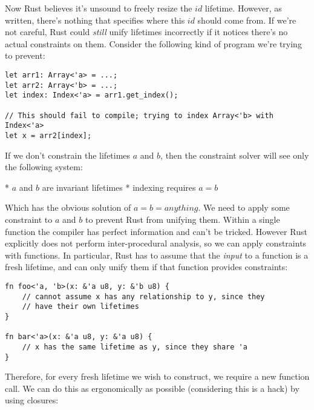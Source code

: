 Now Rust believes it's unsound to freely resize the $id$ lifetime. However, as
written, there's nothing that specifies where this $id$ should come from. If
we're not careful, Rust could \emph{still} unify lifetimes incorrectly if it notices
there's no actual constraints on them. Consider the following kind of program
we're trying to prevent:

\begin{verbatim}
let arr1: Array<'a> = ...;
let arr2: Array<'b> = ...;
let index: Index<'a> = arr1.get_index();

// This should fail to compile; trying to index Array<'b> with Index<'a>
let x = arr2[index];
\end{verbatim}

If we don't constrain the lifetimes $a$ and $b$, then the constraint solver
will see only the following system:

* $a$ and $b$ are invariant lifetimes
* indexing requires $a = b$

Which has the obvious solution of $a = b = anything$. We need to apply some
constraint to $a$ and $b$ to prevent Rust from unifying them. Within a single
function the compiler has perfect information and can't be tricked. However
Rust explicitly does not perform inter-procedural analysis, so we can apply
constraints with functions. In particular, Rust has to assume that the \emph{input}
to a function is a fresh lifetime, and can only unify them if that function
provides constraints:

\begin{verbatim}
fn foo<'a, 'b>(x: &'a u8, y: &'b u8) {
    // cannot assume x has any relationship to y, since they
    // have their own lifetimes
}

fn bar<'a>(x: &'a u8, y: &'a u8) {
    // x has the same lifetime as y, since they share 'a
}
\end{verbatim}

Therefore, for every fresh lifetime we wish to construct, we require a new
function call. We can do this as ergonomically as possible (considering this
is a hack) by using closures:

